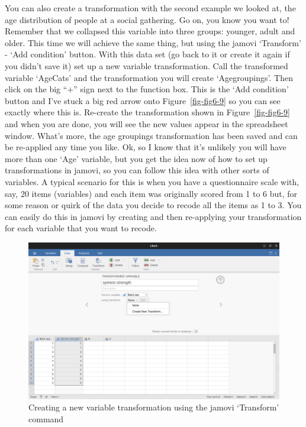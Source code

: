 \documentclass[
  a4paper,
]{book}
\begin{document}
You can also create a transformation with the second example we looked
at, the age distribution of people at a social gathering. Go on, you
know you want to! Remember that we collapsed this variable into three
groups: younger, adult and older. This time we will achieve the same
thing, but using the jamovi `Transform' - `Add condition' button. With
this data set (go back to it or create it again if you didn't save it)
set up a new variable transformation. Call the transformed variable
`AgeCats' and the transformation you will create `Agegroupings'. Then
click on the big ``\(+\)'' sign next to the function box. This is the
`Add condition' button and I've stuck a big red arrow onto
Figure~\ref{fig-fig6-9} so you can see exactly where this is. Re-create
the transformation shown in Figure~\ref{fig-fig6-9} and when you are
done, you will see the new values appear in the spreadsheet window.
What's more, the age groupings transformation has been saved and can be
re-applied any time you like. Ok, so I know that it's unlikely you will
have more than one `Age' variable, but you get the idea now of how to
set up transformations in jamovi, so you can follow this idea with other
sorts of variables. A typical scenario for this is when you have a
questionnaire scale with, say, 20 items (variables) and each item was
originally scored from 1 to 6 but, for some reason or quirk of the data
you decide to recode all the items as 1 to 3. You can easily do this in
jamovi by creating and then re-applying your transformation for each
variable that you want to recode.

\begin{figure}

\includegraphics[width=1\textwidth,height=\textheight]{images/fig6-7.png} \hfill{}

\caption{\label{fig-fig6-7}Creating a new variable transformation using
the jamovi `Transform' command}

\end{figure}
\end{document}
